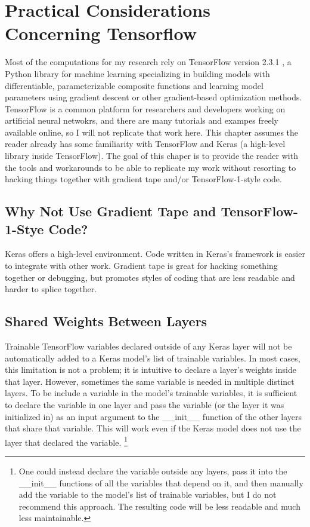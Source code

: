 \chapter{Practical Considerations Concerning Tensorflow}
Most of the computations for my research rely on TensorFlow version 2.3.1 \cite{tensorflow}, a Python library for machine learning specializing in building models with differentiable, parameterizable composite functions and learning model parameters using gradient descent or other gradient-based optimization methods. TensorFlow is a common platform for researchers and developers working on artificial neural netwokrs, and there are many tutorials and exampes freely available online, so I will not replicate that work here. This chapter assumes the reader already has some familiarity with TensorFlow and Keras \cite{keras} (a high-level library inside TensorFlow). The goal of this chaper is to provide the reader with the tools and workarounds to be able to replicate my work without resorting to hacking things together with gradient tape and/or TensorFlow-1-style code.

\section{Why Not Use Gradient Tape and TensorFlow-1-Stye Code?}
Keras offers a high-level environment. Code written in Keras's framework is easier to integrate with other work. Gradient tape is great for hacking something together or debugging, but promotes styles of coding that are less readable and harder to splice together.


\section{Shared Weights Between Layers}
Trainable TensorFlow variables declared outside of any Keras layer will not be automatically added to a Keras model's list of trainable variables. In most cases, this limitation is not a problem; it is intuitive to declare a layer's weights inside that layer. However, sometimes the same variable is needed in multiple distinct layers. To be include a variable in the model's trainable variables, it is sufficient to declare the variable in one layer and pass the variable (or the layer it was initialized in) as an input argument to the \_\_init\_\_ function of the other layers that share that variable. This will work even if the Keras model does not use the layer that declared the variable. \footnote{One could instead declare the variable outside any layers, pass it into the \_\_init\_\_ functions of all the variables that depend on it, and then manually add the variable to the model's list of trainable variables, but I do not recommend this approach. The resulting code will be less readable and much less maintainable.}

